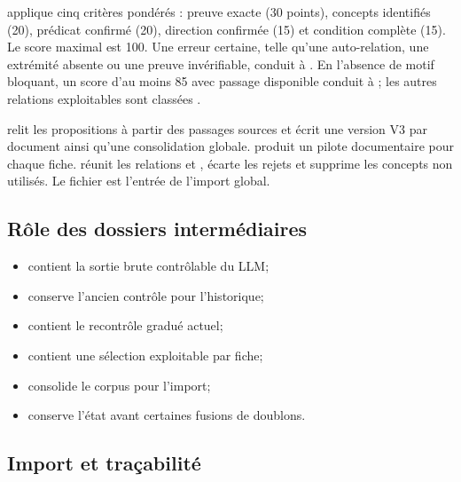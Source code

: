  applique cinq critères pondérés : preuve exacte (30 points),
concepts identifiés (20), prédicat confirmé (20), direction confirmée (15) et condition
complète (15). Le score maximal est 100. Une erreur certaine, telle qu'une auto-relation,
une extrémité absente ou une preuve invérifiable, conduit à . En l'absence de
motif bloquant, un score d'au moins 85 avec passage disponible conduit à ;
les autres relations exploitables sont classées .


 relit les propositions à partir des passages sources et écrit
une version V3 par document ainsi qu'une consolidation globale. 
produit un pilote documentaire pour chaque fiche.  réunit les
relations  et , écarte les rejets et supprime les concepts non
utilisés. Le fichier  est l'entrée de l'import global.

\subsection{Rôle des dossiers intermédiaires}

\begin{itemize}
  \item {} contient la sortie brute contrôlable du LLM;
  \item {} conserve l'ancien contrôle pour l'historique;
  \item {} contient le recontrôle gradué actuel;
  \item {} contient une sélection exploitable par fiche;
  \item {} consolide le corpus pour l'import;
  \item {} conserve l'état avant certaines fusions de doublons.
\end{itemize}

\subsection{Import et traçabilité}

